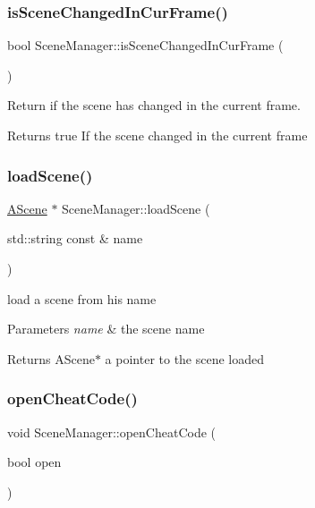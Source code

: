 \subsubsection{\texorpdfstring{is\+Scene\+Changed\+In\+Cur\+Frame()}{isSceneChangedInCurFrame()}}
{\footnotesize\ttfamily bool Scene\+Manager\+::is\+Scene\+Changed\+In\+Cur\+Frame (\begin{DoxyParamCaption}{ }\end{DoxyParamCaption})\hspace{0.3cm}{\ttfamily [static]}}



Return if the scene has changed in the current frame. 

\begin{DoxyReturn}{Returns}
true If the scene changed in the current frame 
\end{DoxyReturn}
\mbox{\label{class_scene_manager_ad9b4726f3b184fe06d4753513f525a44}} 
\subsubsection{\texorpdfstring{load\+Scene()}{loadScene()}}
{\footnotesize\ttfamily \hyperlink{class_a_scene}{A\+Scene} $\ast$ Scene\+Manager\+::load\+Scene (\begin{DoxyParamCaption}\item[{std\+::string const \&}]{name }\end{DoxyParamCaption})\hspace{0.3cm}{\ttfamily [static]}}



load a scene from his name 


\begin{DoxyParams}{Parameters}
{\em name} & the scene name \\
\hline
\end{DoxyParams}
\begin{DoxyReturn}{Returns}
A\+Scene$\ast$ a pointer to the scene loaded 
\end{DoxyReturn}
\mbox{\label{class_scene_manager_a391bfd7e765b42a09993977b7371df32}} 
\subsubsection{\texorpdfstring{open\+Cheat\+Code()}{openCheatCode()}}
{\footnotesize\ttfamily void Scene\+Manager\+::open\+Cheat\+Code (\begin{DoxyParamCaption}\item[{bool}]{open }\end{DoxyParamCaption})\hspace{0.3cm}{\ttfamily [static]}}



